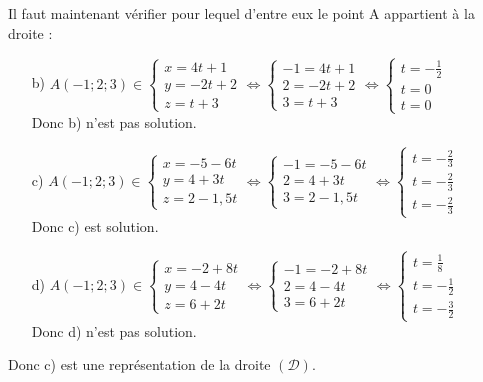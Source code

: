 \documentclass[a4paper, 12pt]{article}
\begin{document}
Il faut maintenant vérifier pour lequel d'entre eux le point A appartient à la droite :
\vspace{3mm}
\begin{itemize}
    \item[b)] $A(-1; 2; 3) \in \begin{cases} x = 4t + 1 \\ y = -2t + 2 \\ z = t + 3 \end{cases} 
        \iff \begin{cases} -1 = 4t + 1\\ 2 = -2t + 2\\ 3 = t + 3\end{cases} 
        \iff \begin{cases} t = -\frac{1}{2} \\ t = 0 \\ t = 0\end{cases}$
        \\ Donc b) n'est pas solution. \vspace{3mm}
    \item[c)] $A(-1; 2; 3) \in \begin{cases} x = -5 - 6t \\ y = 4 + 3t \\ z = 2 - 1,5t \end{cases} 
        \iff \begin{cases} -1 = -5 -6t\\ 2 = 4 + 3t \\ 3 = 2 - 1,5t\end{cases} 
        \iff \begin{cases} t = -\frac{2}{3} \\ t = -\frac{2}{3} \\ t = - \frac{2}{3} \end{cases}$
        \\ Donc c) est solution. \vspace{3mm}
    \item[d)] $A(-1; 2; 3) \in \begin{cases} x = -2 + 8t \\ y = 4 - 4t \\ z = 6 + 2t \end{cases} 
        \iff \begin{cases} -1 = -2 +8t \\ 2 = 4 - 4t\\ 3 = 6 + 2t\end{cases} 
        \iff \begin{cases} t = \frac{1}{8} \\ t = -\frac{1}{2} \\ t = -\frac{3}{2} \end{cases}$
        \\ Donc d) n'est pas solution.
\end{itemize}
\vspace{3mm}
Donc c) est une représentation de la droite $(\mathcal{D})$.
\end{document}

